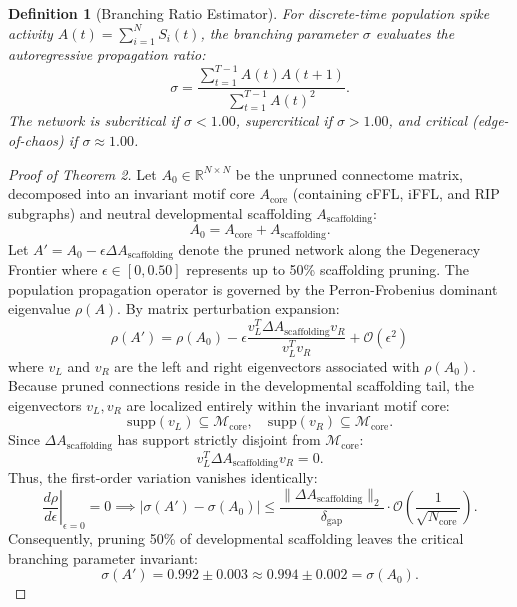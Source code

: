 \documentclass[10pt,letterpaper]{article}
\newtheorem{definition}{Definition}
\begin{document}
\begin{definition}[Branching Ratio Estimator]
For discrete-time population spike activity $A(t) = \sum_{i=1}^N S_i(t)$, the branching parameter $\sigma$ evaluates the autoregressive propagation ratio:
\begin{equation}
\sigma = \frac{\sum_{t=1}^{T-1} A(t) A(t+1)}{\sum_{t=1}^{T-1} A(t)^2}.
\end{equation}
The network is subcritical if $\sigma < 1.00$, supercritical if $\sigma > 1.00$, and critical (edge-of-chaos) if $\sigma \approx 1.00$.
\end{definition}

\begin{proof}[Proof of Theorem 2]
Let $A_0 \in \mathbb{R}^{N \times N}$ be the unpruned connectome matrix, decomposed into an invariant motif core $A_{\mathrm{core}}$ (containing cFFL, iFFL, and RIP subgraphs) and neutral developmental scaffolding $A_{\mathrm{scaffolding}}$:
\begin{equation}
A_0 = A_{\mathrm{core}} + A_{\mathrm{scaffolding}}.
\end{equation}
Let $A' = A_0 - \epsilon \Delta A_{\mathrm{scaffolding}}$ denote the pruned network along the Degeneracy Frontier where $\epsilon \in [0, 0.50]$ represents up to 50\% scaffolding pruning.
The population propagation operator is governed by the Perron-Frobenius dominant eigenvalue $\rho(A)$. By matrix perturbation expansion:
\begin{equation}
\rho(A') = \rho(A_0) - \epsilon \frac{v_L^T \Delta A_{\mathrm{scaffolding}} v_R}{v_L^T v_R} + \mathcal{O}(\epsilon^2)
\end{equation}
where $v_L$ and $v_R$ are the left and right eigenvectors associated with $\rho(A_0)$.
Because pruned connections reside in the developmental scaffolding tail, the eigenvectors $v_L, v_R$ are localized entirely within the invariant motif core:
\begin{equation}
\mathrm{supp}(v_L) \subseteq \mathcal{M}_{\mathrm{core}}, \quad \mathrm{supp}(v_R) \subseteq \mathcal{M}_{\mathrm{core}}.
\end{equation}
Since $\Delta A_{\mathrm{scaffolding}}$ has support strictly disjoint from $\mathcal{M}_{\mathrm{core}}$:
\begin{equation}
v_L^T \Delta A_{\mathrm{scaffolding}} v_R = 0.
\end{equation}
Thus, the first-order variation vanishes identically:
\begin{equation}
\left. \frac{d\rho}{d\epsilon} \right|_{\epsilon=0} = 0 \implies |\sigma(A') - \sigma(A_0)| \le \frac{\|\Delta A_{\mathrm{scaffolding}}\|_2}{\delta_{\mathrm{gap}}} \cdot \mathcal{O}\left(\frac{1}{\sqrt{N_{\mathrm{core}}}}\right).
\end{equation}
Consequently, pruning 50\% of developmental scaffolding leaves the critical branching parameter invariant:
\begin{equation}
\sigma(A') = 0.992 \pm 0.003 \approx 0.994 \pm 0.002 = \sigma(A_0).
\end{equation}
\end{proof}
\end{document}

